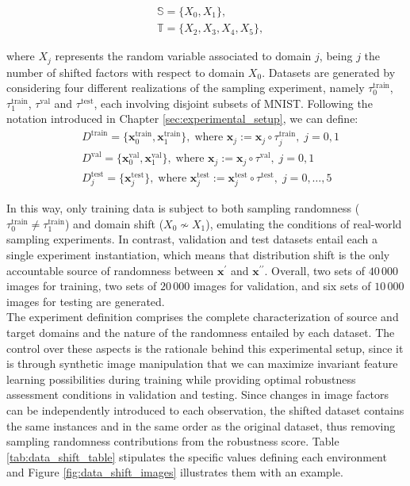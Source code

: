     $$
    \begin{aligned}
        &\mathbb{S} = \{ X_0, X_1\},\\
        &\mathbb{T} = \{ X_2, X_3, X_4, X_5\},
    \end{aligned}
    $$

    where $X_j$ represents the random variable associated to domain $j$, 
    being $j$ the number of shifted factors with respect to domain $X_0$. 
    Datasets are generated by considering
    four different realizations of the sampling experiment, namely $\tau_0^{\text{train}}$, $\tau_1^{\text{train}}$, $\tau^{\text{val}}$
    and $\tau^{\text{test}}$, each involving disjoint subsets of MNIST. Following the notation introduced
    in Chapter \ref{sec:experimental_setup}, we can define:
    $$
    \begin{aligned}
        &D^{\text{train}} = \{\bm{x}_0^{\text{train}}, \bm{x}_1^{\text{train}}\}, \; \text{where } \bm{x}_j := \bm{x}_j \circ \tau_j^{\text{train}}, \;j = 0,1 \\
        &D^{\text{val}} = \{\bm{x}_0^{\text{val}}, \bm{x}_1^{\text{val}}\}, \; \text{where } \bm{x}_j := \bm{x}_j \circ \tau^{\text{val}}, \;j=0,1 \\
        &D_j^{\text{test}} = \{\bm{x}_j^{\text{test}}\}, \; \text{where } \bm{x}_j^{\text{test}} := \bm{x}_j^{\text{test}} \circ \tau^{\text{test}}, \;j = 0,\dots,5
    \end{aligned}
    $$

    In this way, only training data is subject to both sampling randomness ($\tau_0^{\text{train}} \neq \tau_1^{\text{train}}$)
    and domain shift ($X_0 \nsim X_1$), emulating the conditions of real-world sampling experiments.
    In contrast, validation and test datasets entail each a single experiment instantiation, 
    which means that distribution shift is the only accountable source of randomness between
    $\bm{x}^\prime$ and $\bm{x}^{\prime \prime}$. Overall, two sets of $40\,000$ images for training, 
    two sets of $20\,000$ images for validation, and six sets of $10\,000$ images for testing are generated. \\

The experiment definition comprises the complete characterization of source and target domains and
the nature of the randomness entailed by each dataset. The control over these aspects is the rationale behind
this experimental setup, since it is through synthetic image manipulation that we can maximize
invariant feature learning possibilities during training while providing optimal robustness
assessment conditions in validation and testing. Since changes in image factors can be independently 
introduced to each observation, the shifted dataset contains the same instances and in the same order
as the original dataset, thus removing sampling randomness contributions from the robustness score. 
Table \ref{tab:data_shift_table} stipulates the specific values defining each environment
and Figure \ref{fig:data_shift_images} illustrates them with an example.

